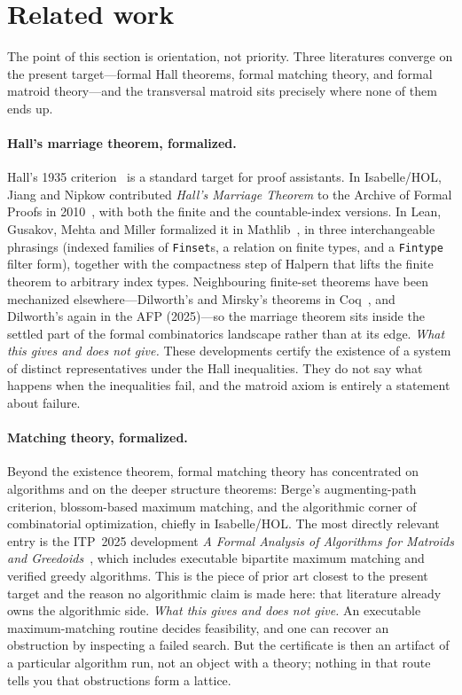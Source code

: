 \documentclass[11pt]{article}
\newcommand{\lean}[1]{\texttt{#1}}
\begin{document}
\section{Related work}\label{sec:related}

The point of this section is orientation, not priority. Three literatures converge on the present
target---formal Hall theorems, formal matching theory, and formal matroid theory---and the
transversal matroid sits precisely where none of them ends up.

\paragraph{Hall's marriage theorem, formalized.} Hall's 1935 criterion~\cite{hall} is a standard
target for proof assistants. In Isabelle/HOL, Jiang and Nipkow contributed \emph{Hall's Marriage
Theorem} to the Archive of Formal Proofs in 2010~\cite{afphall}, with both the finite and the
countable-index versions. In Lean, Gusakov, Mehta and Miller formalized it in
Mathlib~\cite{gusakov}, in three interchangeable phrasings (indexed families of \lean{Finset}s, a
relation on finite types, and a \lean{Fintype} filter form), together with the compactness step of
Halpern that lifts the finite theorem to arbitrary index types. Neighbouring finite-set theorems
have been mechanized elsewhere---Dilworth's and Mirsky's theorems in Coq~\cite{coqdilworth}, and
Dilworth's again in the AFP (2025)---so the marriage theorem sits inside the settled part of the
formal combinatorics landscape rather than at its edge. \emph{What this gives and does not give.}
These developments certify the existence of a
system of distinct representatives under the Hall inequalities. They do not say what happens when
the inequalities fail, and the matroid axiom is entirely a statement about failure.

\paragraph{Matching theory, formalized.} Beyond the existence theorem, formal matching theory has
concentrated on algorithms and on the deeper structure theorems: Berge's augmenting-path
criterion, blossom-based maximum matching, and the algorithmic corner of combinatorial
optimization, chiefly in Isabelle/HOL. The most directly relevant entry is the ITP~2025
development \emph{A Formal Analysis of Algorithms for Matroids and Greedoids}~\cite{itp2025},
which includes executable bipartite maximum matching and verified greedy algorithms. This is the
piece of prior art closest to the present target and the reason no algorithmic claim is made here:
that literature already owns the algorithmic side. \emph{What this gives and does not give.} An
executable maximum-matching routine decides feasibility, and one can recover an obstruction by
inspecting a failed search. But the certificate is then an artifact of a particular algorithm run,
not an object with a theory; nothing in that route tells you that obstructions form a lattice.
\end{document}
